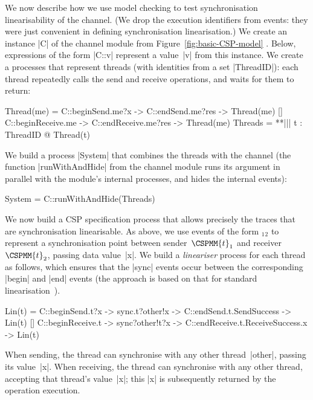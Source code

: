 We now describe how we use model checking to test synchronisation
linearisability of the channel.  (We drop the execution identifiers from
events: they were just convenient in defining synchronisation linearisation.)
We create an instance |C| of the channel module from
Figure~\ref{fig:basic-CSP-model} .  Below, expressions of the form |C::v|
represent a value~|v| from this instance.
%
We create a processes that represent threads (with identities
from a set |ThreadID|): each thread repeatedly calls the send and receive
operations,
and waits for them to return:
%
\begin{cspm}
Thread(me) = 
  C::beginSend.me?x -> C::endSend.me?res -> Thread(me)
  [] C::beginReceive.me -> C::endReceive.me?res -> Thread(me)
Threads = **||| t : ThreadID @ Thread(t)
\end{cspm}
%
We build a process |System| that combines the threads with the channel (the
function |runWithAndHide| from the channel module runs its argument in
parallel with the module's internal processes, and hides the internal events):
\begin{cspm}
System = C::runWithAndHide(Threads)
\end{cspm}

We now build a CSP specification process that allows precisely the traces that
are synchronisation linearisable.  As above, we use events of the form
$_1$$_2$ to represent a synchronisation point
between sender~$\CSPMM{t}_1$ and receiver~$\CSPMM{t}_2$, passing data
value~|x|.  We build a \emph{lineariser} process for each thread as follows,
which ensures that the |sync| events occur between the corresponding |begin|
and |end| events (the approach is based on that for standard
linearisation~\cite{gavin:lock-free-queue}).
%
\begin{cspm}
Lin(t) = 
  C::beginSend.t?x -> sync.t?other!x -> C::endSend.t.SendSuccess -> Lin(t)
  [] C::beginReceive.t -> sync?other!t?x -> C::endReceive.t.ReceiveSuccess.x -> Lin(t)
\end{cspm}
%
When sending, the thread can synchronise with any other thread~|other|,
passing its value~|x|.  When receiving, the thread can synchronise with any
other thread, accepting that thread's value~|x|; this |x| is subsequently
returned by the operation execution.

